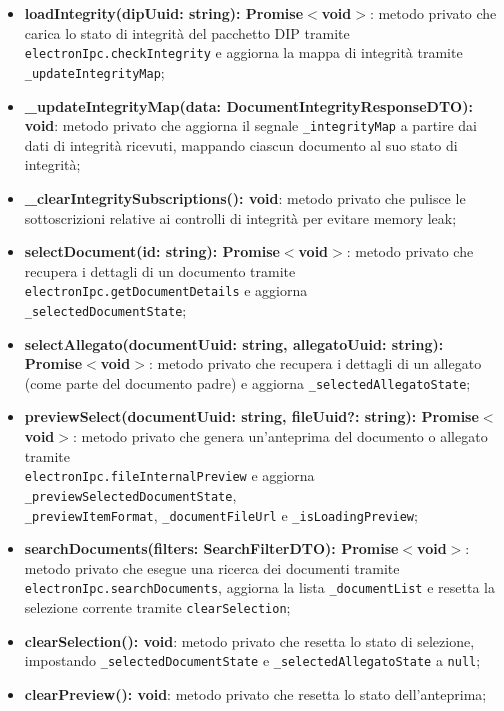 \documentclass[a4paper,12pt]{article}
\begin{document}
{{{{\begin{itemize}
                    \item \textbf{loadIntegrity(dipUuid: string): Promise$<$void$>$}: metodo privato che carica lo stato di integrità del pacchetto DIP tramite \texttt{electronIpc.checkIntegrity} e aggiorna la mappa di integrità tramite \texttt{\_updateIntegrityMap};
                    \item \textbf{\_updateIntegrityMap(data: DocumentIntegrityResponseDTO): void}: metodo privato che aggiorna il segnale \texttt{\_integrityMap} a partire dai dati di integrità ricevuti, mappando ciascun documento al suo stato di integrità;
                    \item \textbf{\_clearIntegritySubscriptions(): void}: metodo privato che pulisce le sottoscrizioni relative ai controlli di integrità per evitare memory leak;
                    \item \textbf{selectDocument(id: string): Promise$<$void$>$}: metodo privato che recupera i dettagli di un documento tramite \texttt{electronIpc.getDocumentDetails} e aggiorna \\ \texttt{\_selectedDocumentState};
                    \item \textbf{selectAllegato(documentUuid: string, allegatoUuid: string): Promise$<$void$>$}: metodo privato che recupera i dettagli di un allegato (come parte del documento padre) e aggiorna \texttt{\_selectedAllegatoState};
                    \item \textbf{previewSelect(documentUuid: string, fileUuid?: string): Promise$<$void$>$}: metodo privato che genera un'anteprima del documento o allegato tramite \\ \texttt{electronIpc.fileInternalPreview} e aggiorna \texttt{\_previewSelectedDocumentState}, \\ \texttt{\_previewItemFormat}, \texttt{\_documentFileUrl} e \texttt{\_isLoadingPreview};
                    \item \textbf{searchDocuments(filters: SearchFilterDTO): Promise$<$void$>$}: metodo privato che esegue una ricerca dei documenti tramite \texttt{electronIpc.searchDocuments}, aggiorna la lista \texttt{\_documentList} e resetta la selezione corrente tramite \texttt{clearSelection};
                    \item \textbf{clearSelection(): void}: metodo privato che resetta lo stato di selezione, impostando \texttt{\_selectedDocumentState} e \texttt{\_selectedAllegatoState} a \texttt{null};
                    \item \textbf{clearPreview(): void}: metodo privato che resetta lo stato dell'anteprima;

\end{itemize}}}}}
\end{document}
